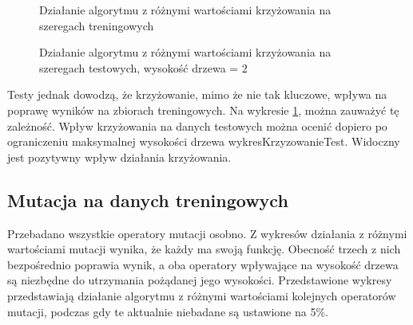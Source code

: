 \documentclass[twoside]{iisthesis}
\begin{document}
\begin{figure}[h]
\caption{Działanie algorytmu z różnymi wartościami krzyżowania na szeregach treningowych}
\centering
\label{wykresKrzyzowanie}
\end{figure}

\begin{figure}[h]
\caption{Działanie algorytmu z różnymi wartościami krzyżowania na szeregach testowych, wysokość drzewa = 2}
\centering
\label{wykresKrzyzowanieTest}
\end{figure}

Testy jednak dowodzą, że krzyżowanie, mimo że nie tak kluczowe, wpływa na poprawę wyników na zbiorach treningowych. Na wykresie \ref{wykresKrzyzowanie}, można zauważyć tę zależność. 
Wpływ krzyżowania na danych testowych można ocenić dopiero po ograniczeniu maksymalnej wysokości drzewa {wykresKrzyzowanieTest}. Widoczny jest pozytywny wpływ działania krzyżowania.

\subsection{Mutacja na danych treningowych}

Przebadano wszystkie operatory mutacji osobno. Z wykresów działania z różnymi wartościami mutacji wynika, że każdy ma swoją funkcję. Obecność trzech z nich bezpośrednio poprawia wynik, a oba operatory wpływające na wysokość drzewa są niezbędne do utrzymania pożądanej jego wysokości. Przedstawione wykresy przedstawiają działanie algorytmu z różnymi wartościami kolejnych operatorów mutacji, podczas gdy te aktualnie niebadane są ustawione na 5\%.
\end{document}
